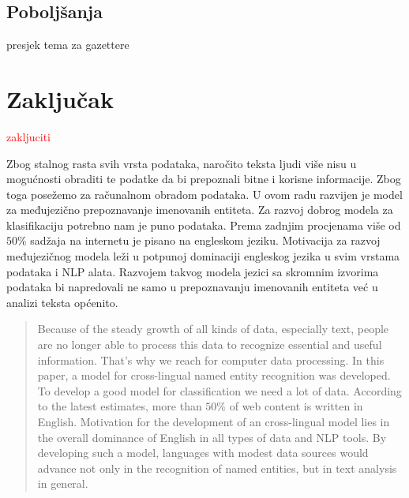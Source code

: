 \documentclass[times, utf8, seminar]{fer}
\newcommand\myworries[1]{\textcolor{red}{#1}}
\begin{document}
\section{Poboljšanja}
	presjek tema za gazettere
\chapter{Zaključak}
\myworries{zakljuciti}


\nocite{*}

\begin{sazetak}

Zbog stalnog rasta svih vrsta podataka, naročito teksta ljudi više nisu u mogućnosti obraditi te podatke da bi prepoznali bitne i korisne informacije. Zbog toga posežemo za računalnom obradom podataka. U ovom radu razvijen je model za međujezično prepoznavanje imenovanih entiteta. Za razvoj dobrog modela za klasifikaciju potrebno nam je puno podataka. Prema zadnjim procjenama više od $ 50\% $ sadžaja na internetu je pisano na engleskom jeziku. Motivacija za razvoj međujezičnog modela leži u potpunoj dominaciji engleskog jezika u svim vrstama podataka i NLP alata. Razvojem takvog modela jezici sa skromnim izvorima podataka bi napredovali ne samo u prepoznavanju imenovanih entiteta već u analizi teksta općenito.

\end{sazetak}
\begin{abstract}
Because of the steady growth of all kinds of data, especially text, people are no longer able to process this data to recognize essential and useful information. That's why we reach for computer data processing. In this paper, a model for cross-lingual named entity recognition was developed. To develop a good model for classification we need a lot of data. According to the latest estimates, more than $ 50 \% $ of web content is written in English. Motivation for the development of an cross-lingual model lies in the overall dominance of English in all types of data and NLP tools. By developing such a model, languages with modest data sources would advance not only in the recognition of named entities, but in text analysis in general.


\end{abstract}
\end{document}
